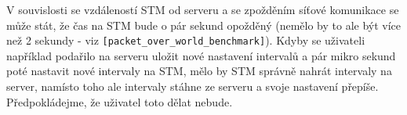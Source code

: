V souvislosti se vzdáleností STM od serveru a se zpožděním síťové komunikace se může
stát, že čas na STM bude o pár sekund opožděný (nemělo by to ale být více než 2 sekundy -
viz \texttt{[packet\_over\_world\_benchmark]}).
Kdyby se uživateli například podařilo na serveru uložit nové nastavení intervalů
a pár mikro sekund poté nastavit nové intervaly na STM, mělo by STM správně nahrát
intervaly na server, namísto toho ale intervaly stáhne ze serveru a svoje nastavení přepíše.
Předpokládejme, že uživatel toto dělat nebude.



